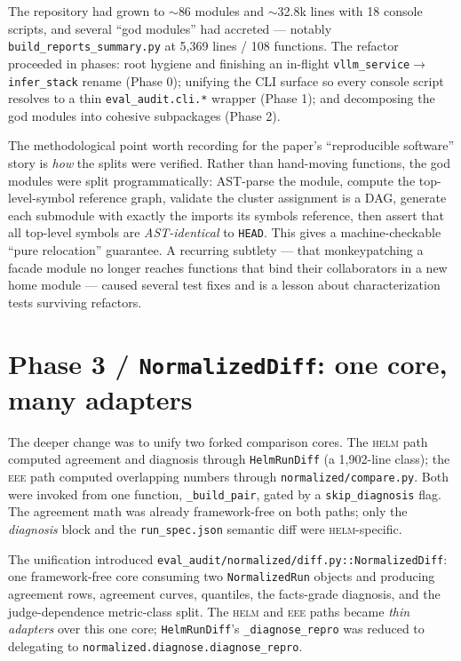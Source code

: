 \documentclass[11pt]{report}
\newcommand{\eeeshort}{\textsc{eee}\xspace}
\newcommand{\code}[1]{\texttt{#1}}
\newcommand{\file}[1]{\texttt{#1}}
\begin{document}
The repository had grown to $\sim$86 modules and $\sim$32.8k lines with 18 console
scripts, and several ``god modules'' had accreted --- notably
\file{build\_reports\_summary.py} at 5{,}369 lines / 108 functions. The refactor
proceeded in phases: root hygiene and finishing an in-flight
\code{vllm\_service}$\rightarrow$\code{infer\_stack} rename (Phase 0); unifying the
CLI surface so every console script resolves to a thin \code{eval\_audit.cli.*}
wrapper (Phase 1); and decomposing the god modules into cohesive subpackages
(Phase 2).

The methodological point worth recording for the paper's ``reproducible software''
story is \emph{how} the splits were verified. Rather than hand-moving functions,
the god modules were split programmatically: AST-parse the module, compute the
top-level-symbol reference graph, validate the cluster assignment is a DAG,
generate each submodule with exactly the imports its symbols reference, then assert
that all top-level symbols are \emph{AST-identical} to \code{HEAD}. This gives a
machine-checkable ``pure relocation'' guarantee. A recurring subtlety --- that
monkeypatching a facade module no longer reaches functions that bind their
collaborators in a new home module --- caused several test fixes and is a lesson
about characterization tests surviving refactors.

\section{Phase 3 / \code{NormalizedDiff}: one core, many adapters}
\label{sec:normalizeddiff}

The deeper change was to unify two forked comparison cores. The \textsc{helm} path
computed agreement and diagnosis through \code{HelmRunDiff} (a 1{,}902-line class);
the \eeeshort path computed overlapping numbers through \code{normalized/compare.py}.
Both were invoked from one function, \code{\_build\_pair}, gated by a
\code{skip\_diagnosis} flag. The agreement math was already framework-free on both
paths; only the \emph{diagnosis} block and the \file{run\_spec.json} semantic diff
were \textsc{helm}-specific.

The unification introduced \code{eval\_audit/normalized/diff.py::NormalizedDiff}:
one framework-free core consuming two \code{NormalizedRun} objects and producing
agreement rows, agreement curves, quantiles, the facts-grade diagnosis, and the
judge-dependence metric-class split. The \textsc{helm} and \eeeshort paths became
\emph{thin adapters} over this one core; \code{HelmRunDiff}'s \code{\_diagnose\_repro}
was reduced to delegating to \code{normalized.diagnose.diagnose\_repro}.
\end{document}
